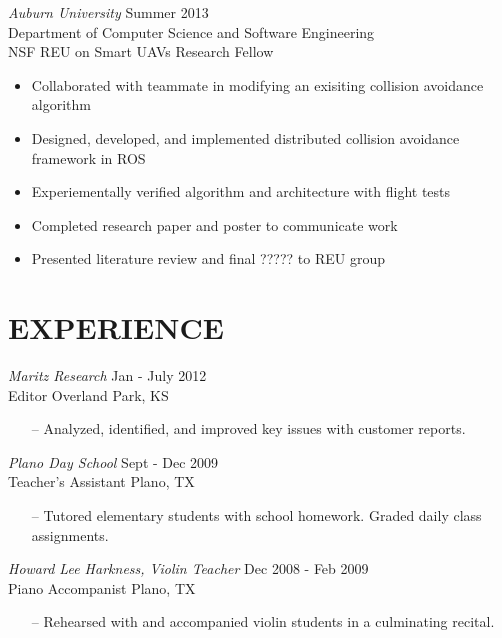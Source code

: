 \documentclass[line,margin]{res}
\begin{document}
\begin{resume}
		{\sl Auburn University}  \hfill  Summer 2013\\
		Department of Computer Science and Software Engineering  \\
		NSF REU on Smart UAVs Research Fellow
                 \begin{itemize}  \itemsep -2pt %
                 \item Collaborated with teammate in modifying an exisiting collision avoidance algorithm 
		 \item Designed, developed, and implemented distributed collision avoidance framework in ROS 
		 \item Experiementally verified algorithm and architecture with flight tests 
		 \item Completed research paper and poster to communicate work
		 \item Presented literature review and final ?????  to REU group 
                 \end{itemize} 
  
\section{EXPERIENCE} 
		
		{\it Maritz Research } \hfill            Jan - July 2012\\
		Editor 		\hfill Overland Park, KS
                 \begin{itemize}  \itemsep -2pt %
                 \item[--]  Analyzed, identified, and improved  key issues with customer reports.
                 \end{itemize} 
                {\it Plano Day School} \hfill        Sept - Dec  2009\\
        	Teacher's Assistant \hfill Plano, TX 
		\begin{itemize}
                   \item [--] Tutored elementary students with school homework. Graded daily class assignments. 
                   \end{itemize} 

              {\it Howard Lee Harkness, Violin Teacher} \hfill        Dec 2008 - Feb 2009\\
        	Piano Accompanist \hfill Plano, TX 
		\begin{itemize}
                   \item [--] Rehearsed with and accompanied violin students in a culminating recital. 
                   \end{itemize} 


\end{resume}
\end{document}
